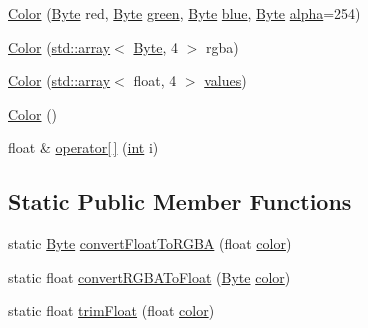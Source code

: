 \begin{DoxyCompactItemize}
\hyperlink{classmc_1_1_color_a49da9f32b70d62c34a2ea380d5dc3eae}{Color} (\hyperlink{namespacemc_a64bc4fa1f43bc4da5c7ac98c04c863e8}{Byte} red, \hyperlink{namespacemc_a64bc4fa1f43bc4da5c7ac98c04c863e8}{Byte} \hyperlink{_s_d_l__opengl__glext_8h_ac14cda87cf6c751d53b65a3cd41c35a1}{green}, \hyperlink{namespacemc_a64bc4fa1f43bc4da5c7ac98c04c863e8}{Byte} \hyperlink{_s_d_l__opengl__glext_8h_a1853b32584a90fa75432925f3e26d0e8}{blue}, \hyperlink{namespacemc_a64bc4fa1f43bc4da5c7ac98c04c863e8}{Byte} \hyperlink{_s_d_l__opengl__glext_8h_ac03904b1f7e359bb2acf10a755e97c5a}{alpha}=254)
\item 
\hyperlink{classmc_1_1_color_a436ad96689f1ca1da36291c632bf60f6}{Color} (\hyperlink{_s_d_l__opengl__glext_8h_a52f38e7d822a46377fde7a02708eedb1}{std\+::array}$<$ \hyperlink{namespacemc_a64bc4fa1f43bc4da5c7ac98c04c863e8}{Byte}, 4 $>$ rgba)
\item 
\hyperlink{classmc_1_1_color_a8517c04d0d219ba58d38dd78275a768c}{Color} (\hyperlink{_s_d_l__opengl__glext_8h_a52f38e7d822a46377fde7a02708eedb1}{std\+::array}$<$ float, 4 $>$ \hyperlink{_s_d_l__opengl__glext_8h_a0aa8cf39c79d294b1d9f4daef5020bec}{values})
\item 
\hyperlink{classmc_1_1_color_ac4d3de0b00fb4965ff453bea21bd5f97}{Color} ()
\item 
float \& \hyperlink{classmc_1_1_color_ad58f03a3459404cf9e58e50baaec8f90}{operator\mbox{[}$\,$\mbox{]}} (\hyperlink{_s_d_l__thread_8h_a6a64f9be4433e4de6e2f2f548cf3c08e}{int} i)
\end{DoxyCompactItemize}
\subsection*{Static Public Member Functions}
\begin{DoxyCompactItemize}
\item 
static \hyperlink{namespacemc_a64bc4fa1f43bc4da5c7ac98c04c863e8}{Byte} \hyperlink{classmc_1_1_color_a6e8a03a26fe7d0580ba2230244b07c82}{convert\+Float\+To\+R\+G\+BA} (float \hyperlink{_s_d_l__opengl__glext_8h_a3ea846f998d64f079b86052b6c4193a8}{color})
\item 
static float \hyperlink{classmc_1_1_color_a016b46c09baf8ed385dbd0c1712b0bb3}{convert\+R\+G\+B\+A\+To\+Float} (\hyperlink{namespacemc_a64bc4fa1f43bc4da5c7ac98c04c863e8}{Byte} \hyperlink{_s_d_l__opengl__glext_8h_a3ea846f998d64f079b86052b6c4193a8}{color})
\item 
static float \hyperlink{classmc_1_1_color_a8fda0b1f0e31bab9ea9a576af292ffe7}{trim\+Float} (float \hyperlink{_s_d_l__opengl__glext_8h_a3ea846f998d64f079b86052b6c4193a8}{color})
\end{DoxyCompactItemize}
